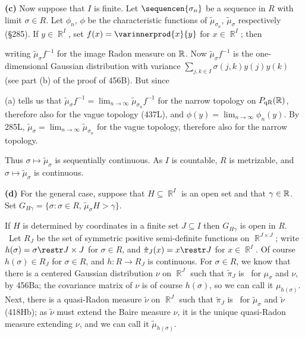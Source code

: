 {\medskip

{\bf (c)} Now suppose that $I$ is finite.   Let $\sequencen{\sigma_n}$ be a
sequence in $R$ with limit $\sigma\in R$.   Let $\phi_n$, $\phi$ be the
characteristic functions of $\tilde\mu_{\sigma_n}$,
$\tilde\mu_{\sigma}$ respectively
(\S285).   If $y\in\BbbR^I$, set $f(x)=\varinnerprod{x}{y}$ for
$x\in\BbbR^I$;  then


\noindent writing $\tilde\mu_{\sigma}f^{-1}$ for the image Radon measure on
$\Bbb R$.   Now $\tilde\mu_{\sigma}f^{-1}$ is the
one-dimensional Gaussian distribution
with variance $\sum_{j,k\in I}\sigma(j,k)y(j)y(k)$ (see part (b) of the
proof of 456B).   But since


\noindent (a) tells us that $\tilde\mu_{\sigma}f^{-1}
=\lim_{n\to\infty}\tilde\mu_{\sigma_n}f^{-1}$ for the narrow topology on
$P_{\text{qR}}(\Bbb R)$, therefore also for the vague topology (437L),
and $\phi(y)=\lim_{n\to\infty}\phi_n(y)$.   By 285L,
$\tilde\mu_{\sigma}=\lim_{n\to\infty}\tilde\mu_{\sigma_n}$ for the vague
topology, therefore also for the narrow topology.

Thus $\sigma\mapsto\tilde\mu_{\sigma}$ is sequentially continuous.   As
$I$ is countable, $R$ is metrizable, and
$\sigma\mapsto\tilde\mu_{\sigma}$ is continuous.

\medskip

{\bf (d)} For the general case, suppose that $H\subseteq\BbbR^I$ is an open
set and that $\gamma\in\Bbb R$.   Set
$G_{H\gamma}=\{\sigma:\sigma\in R$, $\tilde\mu_{\sigma}H>\gamma\}$.

\medskip

 If $H$ is determined by coordinates in a finite set
$J\subseteq I$ then $G_{H\gamma}$ is open in $R$.   \Prf\
Let $R_J$ be the set of symmetric positive semi-definite functions on
$\BbbR^{J\times J}$;  write $h(\sigma)=\sigma\restr J\times J$ for
$\sigma\in R$, and $\tilde\pi_J(x)=x\restr J$ for $x\in\BbbR^I$.
Of course $h(\sigma)\in R_J$ for $\sigma\in R$, and
$h:R\to R_J$ is continuous.   For $\sigma\in R$,
we know that there is a centered Gaussian distribution $\nu$ on $\BbbR^J$
such that $\tilde\pi_J$ is \imp\ for $\mu_{\sigma}$ and $\nu$, by
456Ba;  the covariance matrix of $\nu$
is of course $h(\sigma)$, so we can call it $\mu_{h(\sigma)}$.
Next, there is a quasi-Radon measure $\tilde\nu$
on $\BbbR^J$ such that $\tilde\pi_J$ is \imp\ for $\tilde\mu_{\sigma}$ and
$\tilde\nu$ (418Hb);  as $\tilde\nu$ must extend the Baire measure
$\nu$, it is the unique quasi-Radon measure extending
$\nu$, and we can call it $\tilde\mu_{h(\sigma)}$.

}
